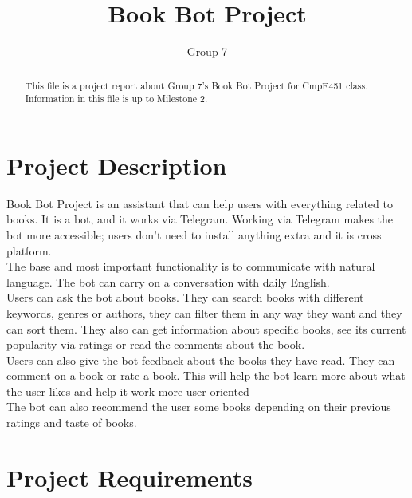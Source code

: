 \documentclass[a4paper]{article}
\title{Book Bot Project}
\author{Group 7}
\begin{document}
\maketitle

\begin{abstract}
This file is a project report about Group 7's Book Bot Project for CmpE451 class. Information in this file is up to Milestone 2.
\end{abstract}

\section{Project Description}

 \qquad Book Bot Project is an assistant that can help users with everything related to books. It is a bot, and it works via Telegram. Working via Telegram makes the bot more accessible; users don't need to install anything extra and it is cross platform. \\
  
  
  \quad The base and most important functionality is to communicate with natural language. The bot can carry on a conversation with daily English. \\
 
  
  \quad Users can ask the bot about books. They can search books with different keywords, genres or authors, they can filter them in any way they want and they can sort them. They also can get information about specific books, see its current popularity via ratings or read the comments about the book.\\
 
  
  \quad Users can also give the bot feedback about the books they have read. They can comment on a book or rate a book. This will help the bot learn more about what the user likes and help it work more user oriented \\
 
  
  \quad The bot can also recommend the user some books depending on their previous ratings and taste of books.

\section{Project Requirements}
\end{document}
